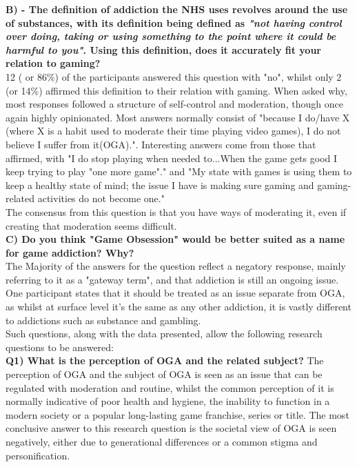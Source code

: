 \documentclass[conference]{IEEEtran}
\begin{document}
 \textbf{B) - The definition of addiction the NHS uses revolves around the use of substances, with its definition being defined as \textit{"not having control over doing, taking or using something to the point where it could be harmful to you"}. Using this definition, does it accurately fit your relation to gaming?}\\

12 ( or 86\%) of the participants answered this question with "no", whilst only 2 (or 14\%) affirmed this definition to their relation with gaming. When asked why, most responses followed a structure of self-control and moderation, though once again highly opinionated. Most answers normally consist of "because I do/have X (where X is a habit used to moderate their time playing video games), I do not believe I suffer from it(OGA).". Interesting answers come from those that affirmed, with "I do stop playing when needed to...When  the game gets good I keep trying to play "one more game"." and "My state with games is using them to keep a healthy state of mind; the issue I have is making sure gaming and gaming-related activities do not become one."\\

The consensus from this question is that you have ways of moderating it, even if creating that moderation seems difficult.\\

 \textbf{C) Do you think "Game Obsession" would be better suited as a name for game addiction? Why?}\\

The Majority of the answers for the question reflect a negatory response, mainly referring to it as a "gateway term", and that addiction is still an ongoing issue. One participant states that it should be treated as an issue separate from OGA, as whilst at surface level it's the same as any other addiction, it is vastly different to addictions such as substance and gambling.\\

Such questions, along with the data presented, allow the following research questions to be answered:\\

 \textbf{Q1)  What is the perception of OGA and the related subject?}
The perception of OGA and the subject of OGA is seen as an issue that can be regulated with moderation and routine, whilst the common perception of it is normally indicative of poor health and hygiene, the inability to function in a modern society or a popular long-lasting game franchise, series or title. The most conclusive answer to this research question is the societal view of OGA is seen negatively, either due to generational differences or a common stigma and personification.\\
\end{document}
